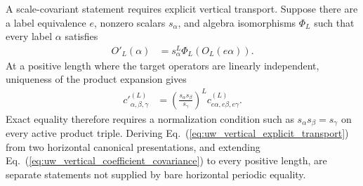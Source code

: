 \documentclass{article}
\begin{document}
A scale-covariant statement requires explicit vertical transport. Suppose
there are a label equivalence $e$, nonzero scalars $s_\alpha$, and algebra
isomorphisms $\Phi_L$ such that every label $\alpha$ satisfies
\begin{align}
    O'_L(\alpha)
    &=s_\alpha^L\Phi_L(O_L(e\alpha)).
    \label{eq:uw_vertical_explicit_transport}
\end{align}
At a positive length where the target operators are linearly independent,
uniqueness of the product expansion gives
\begin{align}
    {c'}^{(L)}_{\alpha,\beta,\gamma}
    &=\left(\frac{s_\alpha s_\beta}{s_\gamma}\right)^L
      c^{(L)}_{e\alpha,e\beta,e\gamma}.
    \label{eq:uw_vertical_coefficient_covariance}
\end{align}
Exact equality therefore requires a normalization condition such as
$s_\alpha s_\beta=s_\gamma$ on every active product triple. Deriving
Eq.~(\ref{eq:uw_vertical_explicit_transport}) from two horizontal canonical
presentations, and extending
Eq.~(\ref{eq:uw_vertical_coefficient_covariance}) to every positive length,
are separate statements not supplied by bare horizontal periodic equality.



\end{document}
